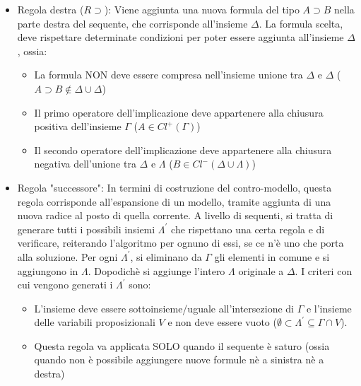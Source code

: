 \documentclass[\main/tesi.tex]{subfiles}
\begin{document}
\begin{itemize}
\begin{itemize}
\begin{itemize}
                    \end{itemize}
              \item Regola destra ($R\supset$): Viene aggiunta una nuova formula del tipo $A \supset B$ nella parte destra del sequente, che corrisponde all'insieme $\Delta$. La formula scelta, deve rispettare determinate condizioni per poter essere aggiunta all'insieme $\Delta$, ossia:
                    \begin{itemize}
                        \item La formula NON deve essere compresa nell'insieme unione tra $\Delta$ e $\Delta$ ($A \supset B \notin \Delta \cup \Delta$)
                        \item Il primo operatore dell'implicazione deve appartenere alla chiusura positiva dell'insieme $\Gamma$ ($A \in Cl^{+}(\Gamma)$)
                        \item Il secondo operatore dell'implicazione deve appartenere alla chiusura negativa dell'unione tra $\Delta$ e $\Lambda$ ($B \in Cl^{-}(\Delta \cup \Lambda)$)
                    \end{itemize}
              \item Regola "successore": In termini di costruzione del contro-modello, questa regola corrisponde all'espansione di un modello, tramite aggiunta di una nuova radice al posto di quella corrente. A livello di sequenti, si tratta di generare tutti i possibili insiemi $\Lambda^{'}$ che rispettano una certa regola e di verificare, reiterando l'algoritmo per ognuno di essi, se ce n'è uno che porta alla soluzione. Per ogni $\Lambda^{'}$, si eliminano da $\Gamma$ gli elementi in comune e si aggiungono in $\Lambda$. Dopodichè si aggiunge l'intero $\Lambda$ originale a $\Delta$. I criteri con cui vengono generati i $\Lambda^{'}$ sono:
                    \begin{itemize}
                        \item L'insieme deve essere sottoinsieme/uguale all'intersezione di $\Gamma$ e l'insieme delle variabili proposizionali $V$ e non deve essere vuoto ($\emptyset \subset \Lambda^{'} \subseteq \Gamma \cap V$).
                        \item Questa regola va applicata SOLO quando il sequente è saturo (ossia quando non è possibile aggiungere nuove formule nè a sinistra nè a destra)
                    \end{itemize}
          \end{itemize}
\end{itemize}
\end{document}
